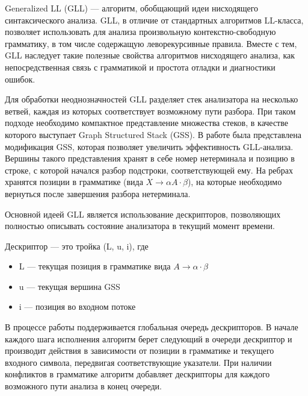 Generalized LL (GLL) --- алгоритм, обобщающий идеи нисходящего синтаксического анализа. GLL, в отличие от стандартных алгоритмов LL-класса, позволяет использовать для анализа произвольную \linebreak контекстно-свободную грамматику, в том числе содержащую леворекурсивные правила. Вместе с тем, GLL наследует такие полезные свойства алгоритмов нисходящего анализа, как непосредственная связь с грамматикой и простота отладки и диагностики ошибок.

Для обработки неоднозначностей GLL разделяет стек анализатора на несколько ветвей, каждая из которых соответствует возможному пути разбора. При таком подходе необходимо компактное представление множества стеков, в качестве которого выступает Graph Structured Stack (GSS). В работе \cite{Afroozeh2015gss} была представлена модификация GSS, которая позволяет увеличить эффективность GLL-анализа. Вершины такого представления хранят в себе номер нетерминала и позицию в строке, с которой начался разбор подстроки, соответствующей ему. На ребрах хранятся позиции в грамматике (вида $X \rightarrow \alpha A \cdot \beta$), на которые необходимо вернуться после завершения разбора нетерминала. 

Основной идеей GLL является использование дескрипторов, позволяющих полностью описывать состояние анализатора в текущий момент времени.

\begin{defn}
	Дескриптор --- это тройка (L, u, i), где
	\begin{itemize}
		\setlength\itemsep{0em}
		\item L --- текущая позиция в грамматике вида $A \rightarrow \alpha \cdot \beta$
		\item u --- текущая вершина GSS
		\item i --- позиция во входном потоке 
	\end{itemize}
\end{defn}  

В процессе работы поддерживается глобальная очередь дескрипторов. В начале каждого шага исполнения алгоритм берет следующий в очереди дескриптор и производит действия в зависимости от позиции в грамматике и текущего входного символа, передвигая соответствующие указатели. 
При наличии конфликтов в грамматике алгоритм добавляет дескрипторы для каждого возможного пути анализа в конец очереди.

